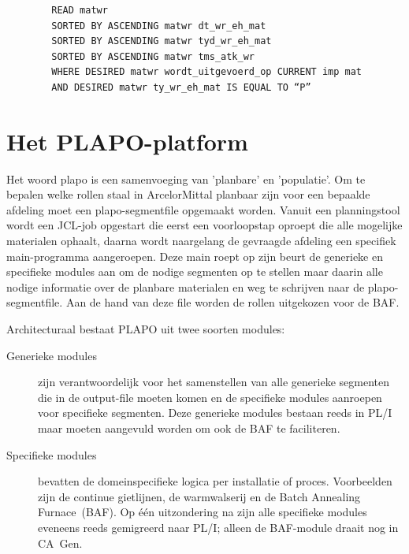 \begin{listing}[h]
    \caption[Voorbeeld CA Gen-code: READ met SORT]{CA Gen-code met een READ inclusief sorteervoorwaarden}
    \label{lst:READ-CAGEN}
    \begin{verbatim}
        READ matwr
        SORTED BY ASCENDING matwr dt_wr_eh_mat
        SORTED BY ASCENDING matwr tyd_wr_eh_mat
        SORTED BY ASCENDING matwr tms_atk_wr
        WHERE DESIRED matwr wordt_uitgevoerd_op CURRENT imp mat
        AND DESIRED matwr ty_wr_eh_mat IS EQUAL TO “P”
    \end{verbatim}
\end{listing}


\section{Het PLAPO-platform}
\label{sec:plapo}

Het woord plapo is een samenvoeging van 'planbare' en 'populatie'. Om te bepalen welke rollen staal in ArcelorMittal planbaar zijn voor een bepaalde afdeling moet een plapo-segmentfile opgemaakt worden. Vanuit een planningstool wordt
een JCL-job opgestart die eerst een voorloopstap oproept die alle mogelijke materialen ophaalt, daarna wordt naargelang de gevraagde afdeling een specifiek main-programma aangeroepen. Deze main roept op zijn beurt de generieke en specifieke modules aan om de nodige segmenten op te stellen maar daarin alle nodige informatie over de planbare materialen en weg te schrijven naar de plapo-segmentfile. Aan de hand van deze file worden de rollen uitgekozen voor de BAF.

Architecturaal bestaat PLAPO uit twee soorten modules:
\begin{description}
    \item[Generieke modules] zijn verantwoordelijk voor het samenstellen van alle generieke segmenten die in de output-file moeten komen en de specifieke modules aanroepen voor specifieke segmenten. Deze generieke modules bestaan reeds in PL/I maar moeten aangevuld worden om ook de BAF te faciliteren.
    \item[Specifieke modules] bevatten de domeinspecifieke logica per installatie of proces.
        Voorbeelden zijn de continue gietlijnen, de warmwalserij en de Batch Annealing Furnace~(BAF).
        Op één uitzondering na zijn alle specifieke modules eveneens reeds gemigreerd naar PL/I; alleen
        de BAF-module draait nog in CA~Gen.
\end{description}

